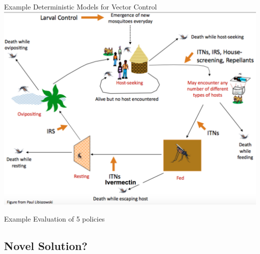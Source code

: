 \documentclass[10pt,usenames,dvipsnames]{beamer}
\begin{document}
\begin{frame}{Example Deterministic Models for Vector Control}
\hspace{1cm}
\centering
\includegraphics[width=.9\textwidth]{images/MosquitoLifeCycle.png}


\end{frame}


\begin{frame}{Example Evaluation of 5 policies}
\hspace{1cm}


\cite{Stuckey2014}

\end{frame}

\subsection{Novel Solution?}
\end{document}
